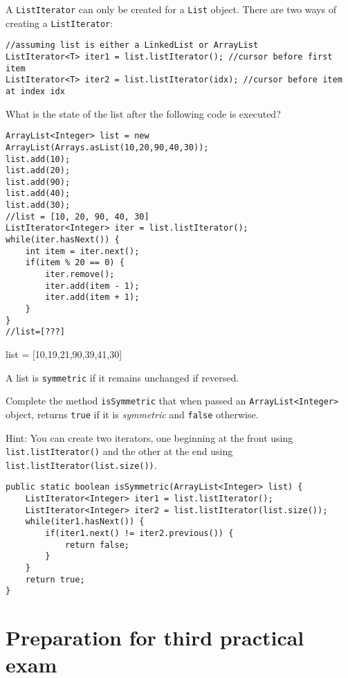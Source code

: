 \begin{questions}
A \texttt{ListIterator} can only be created for a \texttt{List} object. There are two ways of creating a \texttt{ListIterator}:

\begin{lstlisting}
//assuming list is either a LinkedList or ArrayList
ListIterator<T> iter1 = list.listIterator(); //cursor before first item
ListIterator<T> iter2 = list.listIterator(idx); //cursor before item at index idx
\end{lstlisting} 

\ifprintanswers
\else
\newpage
\fi

What is the state of the list after the following code is executed?

\begin{lstlisting}
ArrayList<Integer> list = new ArrayList(Arrays.asList(10,20,90,40,30));
list.add(10);
list.add(20);
list.add(90);
list.add(40);
list.add(30);
//list = [10, 20, 90, 40, 30]
ListIterator<Integer> iter = list.listIterator();
while(iter.hasNext()) {
	int item = iter.next();
	if(item % 20 == 0) {
		iter.remove();
		iter.add(item - 1);
		iter.add(item + 1);
	}
}
//list=[???]
\end{lstlisting}

\ifprintanswers
list = [10,19,21,90,39,41,30]
\else
\fi

\question 

A list is \texttt{symmetric} if it remains unchanged if reversed.

Complete the method \texttt{isSymmetric} that when passed an \texttt{ArrayList<Integer>} object, returns \texttt{true} if it is \emph{symmetric} and \texttt{false} otherwise. 

Hint: You can create two iterators, one beginning at the front using \texttt{list.listIterator()} and the other at the end using \texttt{list.listIterator(list.size())}.

\ifprintanswers
\begin{lstlisting}
public static boolean isSymmetric(ArrayList<Integer> list) {
	ListIterator<Integer> iter1 = list.listIterator();
	ListIterator<Integer> iter2 = list.listIterator(list.size());
	while(iter1.hasNext()) {
		if(iter1.next() != iter2.previous()) {
			return false;
		}
	}
	return true;
}
\end{lstlisting}
\else
\fi
\end{questions}

\newpage

\section*{Preparation for third practical exam}
